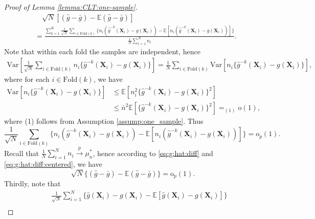 \documentclass[12pt,letterpaper]{article}
\begin{document}
\begin{proof}[Proof of Lemma \ref{lemma:CLT:one-sample}]
\begin{equation}\label{eq:g:hat:diff:centered}
\begin{array}{rl}
&\quad\sqrt{N}\left[(\hat{g}-\bar{g})-\mathbb{E}(\hat{g}-\bar{g})\right]\\
&\displaystyle=\frac{\displaystyle\sum_{k=1}^K\frac{1}{\sqrt{N}}\sum_{i\in\textrm{Fold}(k)}\{n_i(\hat{g}^{-k}(\mathbf{X}_i)-g(\mathbf{X}_i))-\mathbb{E}[n_i(\hat{g}^{-k}(\mathbf{X}_i)-g(\mathbf{X}_i))]\}}{\displaystyle\frac{1}{N}\sum_{i=1}^Nn_i}.
\end{array}
\end{equation}
Note that within each fold the samples are independent, hence 
$$\begin{array}{rl}
\displaystyle\mathrm{Var}\left[\frac{1}{\sqrt{N}}\sum_{i\in\textrm{Fold}(k)}n_i\{\hat{g}^{-k}(\mathbf{X}_i)-g(\mathbf{X}_i)\}\right]=\frac{1}{N}\sum_{i\in\textrm{Fold}(k)}\mathrm{Var}[n_i\{\hat{g}^{-k}(\mathbf{X}_i)-g(\mathbf{X}_i)\}],
\end{array}$$
where for each $i\in\textrm{Fold}(k)$, we have 
$$\begin{array}{rl}
\displaystyle\mathrm{Var}\left[n_i\{\hat{g}^{-k}(\mathbf{X}_i)-g(\mathbf{X}_i)\}\right]\!\!\!\!&\displaystyle\leq\mathbb{E}\left[n_i^2\{\hat{g}^{-k}(\mathbf{X}_i)-g(\mathbf{X}_i)\}^2\right]\\
&\displaystyle\leq\bar{n}^2\mathbb{E}\left[\{\hat{g}^{-k}(\mathbf{X}_i)-g(\mathbf{X}_i)\}^2\right]=_{(1)}\mathrm{o}(1),
\end{array}$$
where (1) follows from Assumption \ref{assump:one_sample}. Thus 
\begin{equation}\label{eq:g_hat:consistency}
\frac{1}{\sqrt{N}}\sum_{i\in\textrm{Fold}(k)}\{n_i(\hat{g}^{-k}(\mathbf{X}_i)-g(\mathbf{X}_i))-\mathbb{E}[n_i(\hat{g}^{-k}(\mathbf{X}_i)-g(\mathbf{X}_i))]\}=\mathrm{o}_p(1).
\end{equation}
Recall that $\displaystyle\frac{1}{N}\sum_{i=1}^Nn_i\overset{p}{\rightarrow}\mu_n^*$, hence according to \eqref{eq:g:hat:diff} and \eqref{eq:g:hat:diff:centered}, we have 
\begin{equation}\label{eq:g:hat:asymptotics}
    \sqrt{N}\{(\hat{g}-\bar{g})-\mathbb{E}(\hat{g}-\bar{g})\}=\mathrm{o}_p(1).
\end{equation}
Thirdly, note that 
\begin{equation}\label{eq:dif:g:hat:o(1)}
\begin{array}{rl}
&\quad\displaystyle\frac{1}{\sqrt{N}}\sum_{i=1}^N\{\hat{g}(\mathbf{X}_i)-g(\mathbf{X}_i)-\mathbb{E}[\hat{g}(\mathbf{X}_i)-g(\mathbf{X}_i)]\}\\

\end{array}
\end{equation}
\end{proof}
\end{document}

